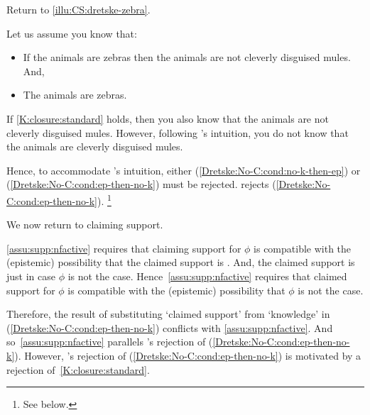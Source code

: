 \begin{note}
  Return to \autoref{illu:CS:dretske-zebra}.

  Let us assume you know that:
  \begin{itemize}
  \item If the animals are zebras then the animals are not cleverly disguised mules. And,
  \item The animals are zebras.
  \end{itemize}

  If \ref{K:closure:standard} holds, then you also know that the animals are not cleverly disguised mules.
  However, following \citeauthor{Dretske:1970to}'s intuition, you do not know that the animals are cleverly disguised mules.

  Hence, to accommodate \citeauthor{Dretske:1970to}'s intuition, either (\ref{Dretske:No-C:cond:no-k-then-ep}) or (\ref{Dretske:No-C:cond:ep-then-no-k}) must be rejected.
  \citeauthor{Dretske:1970to} rejects (\ref{Dretske:No-C:cond:ep-then-no-k}).\nolinebreak
  \footnote{
    See below.
  }
\end{note}

\begin{note}
  We now return to claiming support.

  \autoref{assu:supp:nfactive} requires that claiming support for \(\phi\) is compatible with the (epistemic) possibility that the claimed support is \nmom{}.
  And, the claimed support is \misled{} just in case \(\phi\) is not the case.
  Hence~\autoref{assu:supp:nfactive} requires that claimed support for \(\phi\) is compatible with the (epistemic) possibility that \(\phi\) is not the case.

  Therefore, the result of substituting `claimed support' from `knowledge' in (\ref{Dretske:No-C:cond:ep-then-no-k}) conflicts with \autoref{assu:supp:nfactive}.
  And so~\autoref{assu:supp:nfactive} parallels \citeauthor{Dretske:1970to}'s rejection of (\ref{Dretske:No-C:cond:ep-then-no-k}).
  However, \citeauthor{Dretske:1970to}'s rejection of (\ref{Dretske:No-C:cond:ep-then-no-k}) is motivated by a rejection of~\ref{K:closure:standard}.
\end{note}

